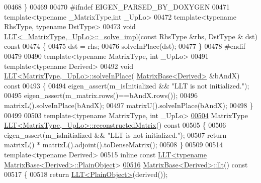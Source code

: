 \begin{DoxyCode}
00468 \}
00469 
00470 \textcolor{preprocessor}{#ifndef EIGEN\_PARSED\_BY\_DOXYGEN}
00471 \textcolor{keyword}{template}<\textcolor{keyword}{typename} \_MatrixType,\textcolor{keywordtype}{int} \_UpLo>
00472 \textcolor{keyword}{template}<\textcolor{keyword}{typename} RhsType, \textcolor{keyword}{typename} DstType>
00473 \textcolor{keywordtype}{void} \hyperlink{group___cholesky___module_class_eigen_1_1_l_l_t}{LLT<\_MatrixType,\_UpLo>::\_solve\_impl}(\textcolor{keyword}{const} RhsType &rhs, DstType &
      dst)\textcolor{keyword}{ const}
00474 \textcolor{keyword}{}\{
00475   dst = rhs;
00476   solveInPlace(dst);
00477 \}
00478 \textcolor{preprocessor}{#endif}
00479 
00490 \textcolor{keyword}{template}<\textcolor{keyword}{typename} MatrixType, \textcolor{keywordtype}{int} \_UpLo>
00491 \textcolor{keyword}{template}<\textcolor{keyword}{typename} Derived>
00492 \textcolor{keywordtype}{void} \hyperlink{group___cholesky___module_class_eigen_1_1_l_l_t}{LLT<MatrixType,\_UpLo>::solveInPlace}(
      \hyperlink{group___core___module_class_eigen_1_1_matrix_base}{MatrixBase<Derived>} &bAndX)\textcolor{keyword}{ const}
00493 \textcolor{keyword}{}\{
00494   eigen\_assert(m\_isInitialized && \textcolor{stringliteral}{"LLT is not initialized."});
00495   eigen\_assert(m\_matrix.rows()==bAndX.rows());
00496   matrixL().solveInPlace(bAndX);
00497   matrixU().solveInPlace(bAndX);
00498 \}
00499 
00503 \textcolor{keyword}{template}<\textcolor{keyword}{typename} MatrixType, \textcolor{keywordtype}{int} \_UpLo>
\hyperlink{group___cholesky___module_a8b6ba1bc41811c50e65cac8db597d802}{00504} MatrixType \hyperlink{group___cholesky___module_a8b6ba1bc41811c50e65cac8db597d802}{LLT<MatrixType,\_UpLo>::reconstructedMatrix}()\textcolor{keyword}{ const}
00505 \textcolor{keyword}{}\{
00506   eigen\_assert(m\_isInitialized && \textcolor{stringliteral}{"LLT is not initialized."});
00507   \textcolor{keywordflow}{return} matrixL() * matrixL().adjoint().toDenseMatrix();
00508 \}
00509 
00514 \textcolor{keyword}{template}<\textcolor{keyword}{typename} Derived>
00515 \textcolor{keyword}{inline} \textcolor{keyword}{const} \hyperlink{group___cholesky___module_class_eigen_1_1_l_l_t}{LLT<typename MatrixBase<Derived>::PlainObject}>
\hyperlink{group___core___module_a90c45f7a30265df792d5aeaddead2635}{00516} \hyperlink{group___core___module_a90c45f7a30265df792d5aeaddead2635}{MatrixBase<Derived>::llt}()\textcolor{keyword}{ const}
00517 \textcolor{keyword}{}\{
00518   \textcolor{keywordflow}{return} \hyperlink{group___cholesky___module_class_eigen_1_1_l_l_t}{LLT<PlainObject>}(derived());

\end{DoxyCode}
